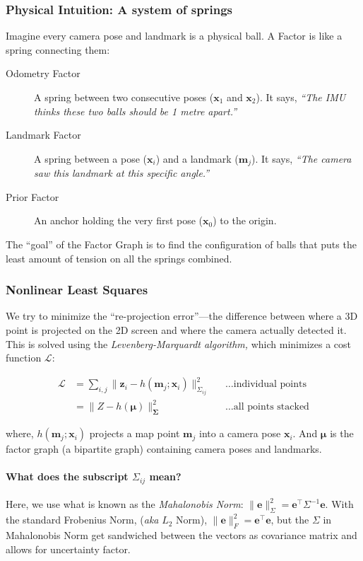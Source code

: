 \documentclass[11pt]{article}
\begin{document}
\subsubsection{Physical Intuition: A system of springs}
\label{sec:org5f55a97}

Imagine every camera pose and landmark is a physical
ball.  A Factor is like a spring connecting
them:

\begin{description}
\item[{Odometry Factor}] A spring between two consecutive
poses (\(\mathbf{x}_1\) and \(\mathbf{x}_2\)).  It says,
\emph{``The IMU thinks these two balls should be 1 metre
apart.''}
\item[{Landmark Factor}] A spring between a pose
(\(\mathbf{x}_i\)) and a landmark (\(\mathbf{m}_j\)).  It
says, \emph{``The camera saw this landmark at this specific
angle.''}
\item[{Prior Factor}] An anchor holding the very first pose
(\(\mathbf{x}_0\)) to the origin.
\end{description}

The ``goal'' of the Factor Graph is to find the
configuration of balls that puts the least amount of
tension on all the springs combined.
\subsubsection{Nonlinear Least Squares}
\label{sec:nonlinear-least-squares}
We try to minimize the ``re-projection error''---the
difference between where a 3D point is projected on the
2D screen and where the camera actually detected it.
This is solved using the \emph{Levenberg-Marquardt
algorithm,} which minimizes a cost function
\(\mathcal{L}\):

\begin{align*}
  \mathcal{L}
  &= \sum_{i,j} \lVert \mathbf{z}_i - h(\mathbf{m}_j;
    \mathbf{x}_i) \rVert_{\Sigma_{ij}}^2
  && \text{\ldots individual points} \\
  &= \lVert Z - h(\boldsymbol{\mu})
    \rVert_{\boldsymbol{\Sigma}}^2
  && \text{\ldots all points stacked}
\end{align*}

where, \(h(\mathbf{m}_j; \mathbf{x}_i)\) projects a map
point \(\mathbf{m}_j\) into a camera pose \(\mathbf{x}_i\).
And \(\boldsymbol{\mu}\) is the factor graph (a bipartite
graph) containing camera poses and landmarks.
\paragraph*{What does the subscript \(\Sigma_{ij}\) mean?}
\label{sec:org9959cfe}
Here, we use what is known as the \emph{Mahalonobis Norm}:
\(\|\mathbf{e}\| _{\Sigma}^2 = \mathbf{e}^{\top}
\Sigma^{-1} \mathbf{e}\).  With the standard Frobenius
Norm, (\emph{aka} \(L_2\) Norm), \(\|\mathbf{e}\|_F^2 =
\mathbf{e}^{\top}\mathbf{e}\), but the \(\Sigma\) in
Mahalonobis Norm get sandwiched between the vectors as
covariance matrix and allows for uncertainty factor.
\end{document}
